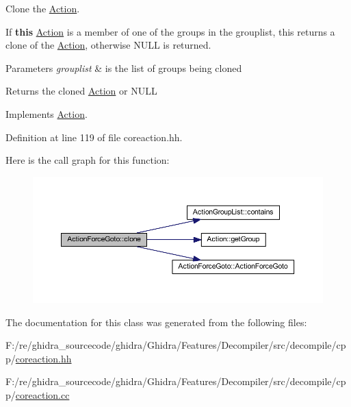 Clone the \mbox{\hyperlink{class_action}{Action}}. 

If {\bfseries{this}} \mbox{\hyperlink{class_action}{Action}} is a member of one of the groups in the grouplist, this returns a clone of the \mbox{\hyperlink{class_action}{Action}}, otherwise N\+U\+LL is returned. 
\begin{DoxyParams}{Parameters}
{\em grouplist} & is the list of groups being cloned \\
\hline
\end{DoxyParams}
\begin{DoxyReturn}{Returns}
the cloned \mbox{\hyperlink{class_action}{Action}} or N\+U\+LL 
\end{DoxyReturn}


Implements \mbox{\hyperlink{class_action_af8242e41d09e5df52f97df9e65cc626f}{Action}}.



Definition at line 119 of file coreaction.\+hh.

Here is the call graph for this function\+:
\nopagebreak
\begin{figure}[H]
\begin{center}
\leavevmode
\includegraphics[width=350pt]{class_action_force_goto_ab44cdae35f8c6fd4051b0ddb435fee9a_cgraph}
\end{center}
\end{figure}


The documentation for this class was generated from the following files\+:\begin{DoxyCompactItemize}
\item 
F\+:/re/ghidra\+\_\+sourcecode/ghidra/\+Ghidra/\+Features/\+Decompiler/src/decompile/cpp/\mbox{\hyperlink{coreaction_8hh}{coreaction.\+hh}}\item 
F\+:/re/ghidra\+\_\+sourcecode/ghidra/\+Ghidra/\+Features/\+Decompiler/src/decompile/cpp/\mbox{\hyperlink{coreaction_8cc}{coreaction.\+cc}}\end{DoxyCompactItemize}

